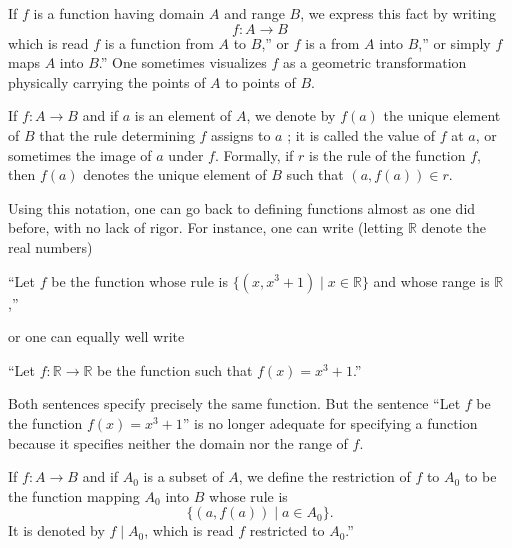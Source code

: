 
If \(f\) is a function having domain \(A\) and range \(B\), we express this fact by writing
\[
f : A \rightarrow B
\]
which is read \(f\) is a function from \(A\) to \(B\),'' or \(f\) is a 
 from \(A\) into \(B\),'' or simply \(f\) maps \(A\) into \(B\).'' 
One sometimes visualizes \(f\) as a geometric transformation physically carrying 
the points of \(A\) to points of \(B\).

If \(f : A \rightarrow B\) and if \(a\) is an element of \(A\), 
we denote by \(f(a)\) the unique element of \(B\) that the rule determining 
\(f\) assigns to \(a\) ; it is called the value of \(f\) at \(a\), 
or sometimes the image of \(a\) under \(f\). 
Formally, if \(r\) is the rule of the function \(f\), 
then \(f(a)\) denotes the unique element of \(B\) such that \(({a,f(a) }) \in r\).

Using this notation, one can go back to defining functions almost as one did before, 
with no lack of rigor. For instance, one can write 
(letting \(\mathbb{R}\) denote the real numbers)
\begin{centeredblock}
 ``Let \(f\) be the function whose rule is \(\{ {({x,x^{3} + 1}) \mid x \in \mathbb{R}}\}\) and whose range is \(\mathbb{R}\),''
\end{centeredblock}
or one can equally well write

\begin{centeredblock}
 ``Let \(f : \mathbb{R} \rightarrow \mathbb{R}\) be the function such that \(f(x) = x^{3} + 1\).''
\end{centeredblock}
Both sentences specify precisely the same function. 
But the sentence ``Let \(f\) be the function \(f(x) = x^{3} + 1\)'' 
is no longer adequate for specifying a function because it specifies 
neither the domain nor the range of \(f\).

\begin{definition}
 If \(f : A \rightarrow B\) and if \(A_{0}\) is a subset of \(A\), we define the restriction of \(f\) to \(A_{0}\) to be the function mapping \(A_{0}\) into \(B\) whose rule is
 \[
 \{ {({a,f(a) }) \mid a \in {A}_{0}}\} \text{.}
 \]
 It is denoted by \(f \mid {A}_{0}\), which is read \(f\) restricted to \(A_{0}\).''
\end{definition}

